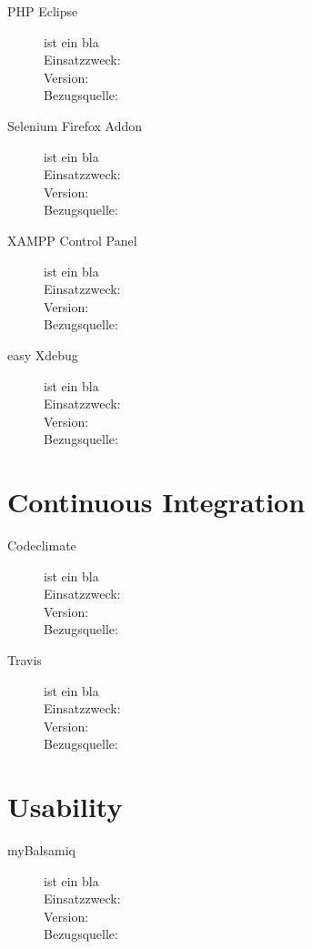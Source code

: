 \begin{description}
	\item [PHP Eclipse] ist ein bla \\
	Einsatzzweck: \\
	Version: \\
	Bezugsquelle: \\
	
	
	\item [Selenium Firefox Addon] ist ein bla \\
	Einsatzzweck: \\
	Version: \\
	Bezugsquelle: \\
	
	
	\item [XAMPP Control Panel] ist ein bla \\
	Einsatzzweck: \\
	Version: \\
	Bezugsquelle: \\
	
	
	\item [easy Xdebug] ist ein bla \\
	Einsatzzweck: \\
	Version: \\
	Bezugsquelle: \\
\end{description}



\section{Continuous Integration}

\begin{description}
	\item [Codeclimate] ist ein bla \\
	Einsatzzweck: \\
	Version: \\
	Bezugsquelle: \\
	
	
	\item [Travis] ist ein bla \\
	Einsatzzweck: \\
	Version: \\
	Bezugsquelle: \\
\end{description}



\section{Usability}

\begin{description}
	\item [myBalsamiq] ist ein bla \\
	Einsatzzweck: \\
	Version: \\
	Bezugsquelle: \\
\end{description}


